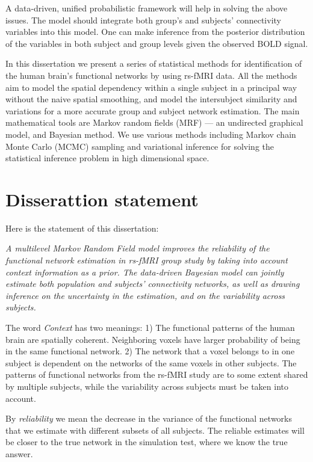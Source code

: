A data-driven, unified probabilistic framework will help in solving the above
issues. The model should integrate both group's and subjects' connectivity
variables into this model. One can make inference from the posterior
distribution of the variables in both subject and group levels given the
observed BOLD signal.

In this dissertation we present a series of statistical methods for identification of
the human brain's functional networks by using rs-fMRI data. All the methods
aim to model the spatial dependency within a single subject in a principal way
without the naive spatial smoothing, and model the intersubject similarity and
variations for a more accurate group and subject network estimation. The main
mathematical tools are Markov random fields (MRF) --- an undirected graphical
model, and Bayesian method.  We use various methods including Markov chain Monte
Carlo (MCMC) sampling and variational inference for solving the statistical
inference problem in high dimensional space.

\section{Disserattion statement}
Here is the statement of this dissertation:
\begin{center}
\parbox{5in}{\emph{A multilevel Markov Random Field model improves the
    reliability of the functional network estimation in rs-fMRI group study by
    taking into account context information as a prior. The data-driven Bayesian
    model can jointly estimate both population and subjects' connectivity
    networks, as well as drawing inference on the uncertainty in the estimation,
    and on the variability across subjects. }}
\end{center}

\noindent The word \emph{Context} has two meanings: 1) The functional patterns
of the human brain are spatially coherent. Neighboring voxels have larger probability
of being in the same functional network. 2) The network that a voxel belongs to
in one subject is dependent on the networks of the same voxels in other
subjects. The patterns of functional networks from the rs-fMRI study are to some
extent shared by multiple subjects, while the variability across subjects must
be taken into account.

By \emph{reliability} we mean the decrease in the variance of the functional
networks that we estimate with different subsets of all subjects. The reliable
estimates will be closer to the true network in the simulation test, where we
know the true answer.

